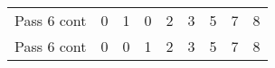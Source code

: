 \documentclass{article}
\begin{document}
\begin{tabular}{l*{7}{c}r}
                                                                                                                                                                                                                                                                                                                                Pass 6 cont  & 0 & 1 & 0 & 2 & 3 & 5 & 7  & 8 \\
                                                                                                                                                                                                                                                                                                                                        Pass 6 cont  & 0 & 0 & 1 & 2 & 3 & 5 & 7  & 8 \\
                                                                                                                                                                                                                                                                                                                                                        
                                                                                                                                                                                                                                                                                                                                                                \end{tabular}
\end{document}
